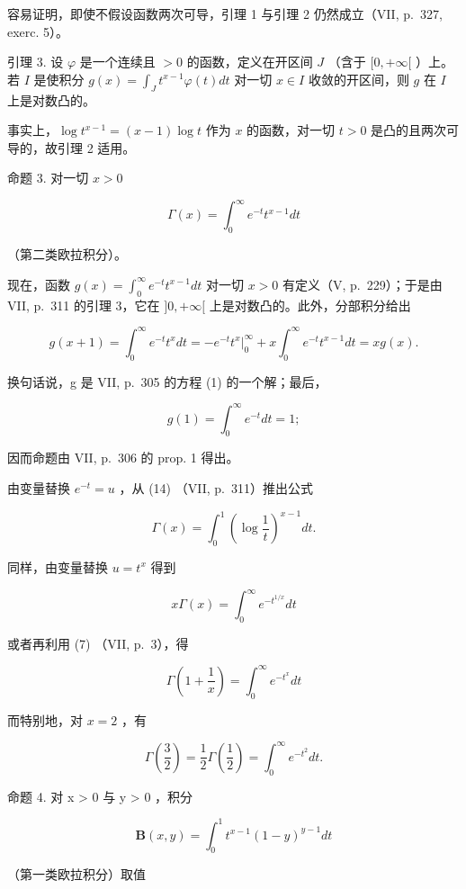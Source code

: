 容易证明，即使不假设函数两次可导，引理 1 与引理 2 仍然成立（VII, p.~327, exerc. 5）。

引理 3. 设 \(\varphi\) 是一个连续且 \(>0\) 的函数，定义在开区间 \(J\) （含于 \([0, +\infty[\) ）上。若 \(I\) 是使积分 \(g(x) = \int_{J} t^{x-1} \varphi(t) dt\) 对一切 \(x \in I\) 收敛的开区间，则 \(g\) 在 \(I\) 上是对数凸的。

事实上，\(\log t^{x - 1} = (x - 1)\log t\) 作为 \(x\) 的函数，对一切 \(t > 0\) 是凸的且两次可导的，故引理 2 适用。

命题 3. 对一切 \(x > 0\)

\[
\Gamma (x) = \int_ {0} ^ {\infty} e ^ {- t} t ^ {x - 1} d t\tag{14}
\]

（第二类欧拉积分）。

现在，函数 \(g(x) = \int_0^\infty e^{-t} t^{x-1} dt\) 对一切 \(x > 0\) 有定义（V, p.~229）；于是由 VII, p.~311 的引理 3，它在 \(]0, +\infty[\) 上是对数凸的。此外，分部积分给出

\[
g (x + 1) = \int_ {0} ^ {\infty} e ^ {- t} t ^ {x} d t = - e ^ {- t} t ^ {x} \Big | _ {0} ^ {\infty} + x \int_ {0} ^ {\infty} e ^ {- t} t ^ {x - 1} d t = x g (x).
\]

换句话说，g 是 VII, p.~305 的方程 (1) 的一个解；最后，

\[
g (1) = \int_ {0} ^ {\infty} e ^ {- t} d t = 1;
\]

因而命题由 VII, p.~306 的 prop. 1 得出。

由变量替换 \(e^{-t}=u\) ，从 (14) （VII, p.~311）推出公式

\[
\Gamma (x) = \int_ {0} ^ {1} \left(\log \frac {1}{t}\right) ^ {x - 1} d t.\tag{15}
\]

同样，由变量替换 \(u = t^{x}\) 得到

\[
x \Gamma (x) = \int_ {0} ^ {\infty} e ^ {- t ^ {1 / x}} d t
\]

或者再利用 (7) （VII, p.~3），得

\[
\Gamma \left(1 + \frac {1}{x}\right) = \int_ {0} ^ {\infty} e ^ {- t ^ {x}} d t\tag{16}
\]

而特别地，对 \(x = 2\) ，有

\[
\Gamma \left(\frac {3}{2}\right) = \frac {1}{2} \Gamma \left(\frac {1}{2}\right) = \int_ {0} ^ {\infty} e ^ {- t ^ {2}} d t.\tag{17}
\]

命题 4. 对 x \textgreater{} 0 与 y \textgreater{} 0 ，积分

\[
\mathbf {B} (x, y) = \int_ {0} ^ {1} t ^ {x - 1} (1 - y) ^ {y - 1} d t
\]

（第一类欧拉积分）取值

